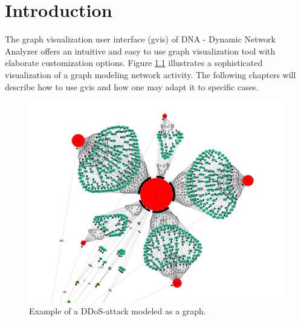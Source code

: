 \chapter{Introduction}
The graph visualization user interface (gvis) of DNA - Dynamic Network Analyzer offers an intuitive and easy to use graph visualization tool with elaborate customization options. Figure \ref{ex:attack} illustrates a sophisticated visualization of a graph modeling network activity. The following chapters will describe how to use gvis and how one may adapt it to specific cases.

\begin{figure} [h]
\centering
\includegraphics [scale=0.6] {images/attack-example}
\caption{Example of a DDoS-attack modeled as a graph.}
\label{ex:attack}
\end{figure}